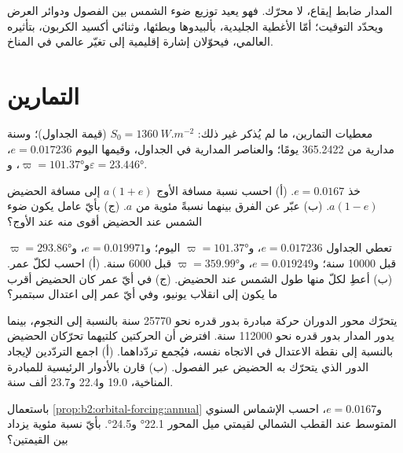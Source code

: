 المدار ضابط إيقاع، لا محرّك. فهو يعيد توزيع ضوء الشمس بين الفصول ودوائر العرض
ويحدّد التوقيت؛ أمّا الأغطية الجليدية، بألبيدوها وبطئها، وثنائي أكسيد الكربون، بتأثيره
العالمي، فيحوّلان إشارة إقليمية إلى تغيّر عالمي في المناخ.

\section*{التمارين}\label{sec:b2:orbital-forcing:exercises}

معطيات التمارين، ما لم يُذكر غير ذلك: $S_0 = \qty{1360}{W.m^{-2}}$ (قيمة
الجداول)؛ وسنة مدارية من \num{365.2422} يومًا؛ والعناصر المدارية في الجداول، وقيمها اليوم
$e = 0.017236$، و$\varpi = \ang{101.37}$، و$\varepsilon = \ang{23.446}$.

\begin{exercise}[$\star$]\label{exo:b2:orbital-forcing:1}
خذ $e = 0.0167$. (أ) احسب نسبة مسافة الأوج $a(1 + e)$ إلى مسافة
الحضيض $a(1 - e)$. (ب) عبّر عن الفرق بينهما نسبةً مئوية من $a$. (ج) بأيّ عامل يكون
ضوء الشمس عند الحضيض أقوى منه عند الأوج؟
\end{exercise}

\begin{exercise}[$\star$]\label{exo:b2:orbital-forcing:2}
تعطي الجداول $e = 0.017236$، و$\varpi = \ang{101.37}$ اليوم؛ و$e = 0.019971$، و$\varpi =
\ang{293.86}$ قبل \num{10000} سنة؛ و$e = 0.019249$، و$\varpi = \ang{359.99}$ قبل \num{6000} سنة.
(أ) احسب  لكلّ عمر. (ب) أعطِ لكلّ منها طول الشمس عند
الحضيض. (ج) في أيّ عمر كان الحضيض أقرب ما يكون إلى انقلاب يونيو، وفي أيّ عمر إلى
اعتدال سبتمبر؟
\end{exercise}

\begin{exercise}[$\star$]\label{exo:b2:orbital-forcing:3}
يتحرّك محور الدوران حركة مبادرة بدور قدره نحو \num{25770} سنة بالنسبة إلى النجوم، بينما
يدور المدار بدور قدره نحو \num{112000} سنة. افترض أن الحركتين كلتيهما تحرّكان
الحضيض بالنسبة إلى نقطة الاعتدال في الاتجاه نفسه، فيُجمع تردّداهما. (أ) اجمع
التردّدين لإيجاد الدور الذي يتحرّك به الحضيض
عبر الفصول. (ب) قارن بالأدوار الرئيسية للمبادرة المناخية، \num{19.0}
و\num{22.4} و\num{23.7} ألف سنة.
\end{exercise}

\begin{exercise}[$\star$]\label{exo:b2:orbital-forcing:4}
باستعمال \cref{prop:b2:orbital-forcing:annual} و$e = 0.0167$، احسب الإشماس السنوي المتوسط عند
القطب الشمالي لقيمتي ميل المحور \ang{22.1} و\ang{24.5}. بأيّ نسبة مئوية يزداد بين
القيمتين؟
\end{exercise}

